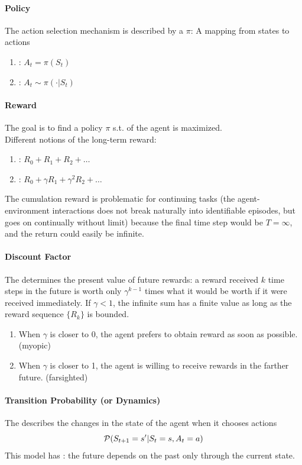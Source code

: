 \documentclass[11pt]{article}
\begin{document}
\paragraph{Policy}
The action selection mechanism is described by a  $\pi$: A mapping from states to actions
\begin{enumerate}
	\item {}: $A_t = \pi(S_t)$
	\item {}: $A_t \sim \pi(\cdot|S_t)$
\end{enumerate}
\paragraph{Reward}
The goal is to find a policy $\pi$ s.t.  of the agent is maximized. \\
Different notions of the long-term reward:
\begin{enumerate}
	\item {}: $R_0 + R_1 + R_2 + \hdots$
	\item {}: $R_0 + \gamma R_1 + \gamma^2 R_2 + \hdots$
\end{enumerate}
The cumulation reward is problematic for continuing tasks (the agent-environment interactions does not break naturally into identifiable episodes, but goes on continually without limit) because the final time step would be $T = \infty$, and the return could easily be infinite.
\paragraph{Discount Factor} The  determines the present value of future rewards: a reward received $k$ time steps in the future is worth only $\gamma^{k-1}$ times what it would be worth if it were received immediately. If $\gamma < 1$, the infinite sum has a finite value as long as the reward sequence $\{R_k\}$ is bounded.
\begin{enumerate}
	\item When $\gamma$ is closer to 0, the agent prefers to obtain reward as soon as possible. (myopic)
	\item When $\gamma$ is closer to 1, the agent is willing to receive rewards in the farther future. (farsighted)
\end{enumerate}


\paragraph{Transition Probability (or Dynamics)}
The  describes the changes in the state of the agent when it chooses actions
$$\mathcal{P}(S_{t+1}=s'|S_t = s, A_t = a)$$
This model has : the future depends on the past only through the current state.
\end{document}
